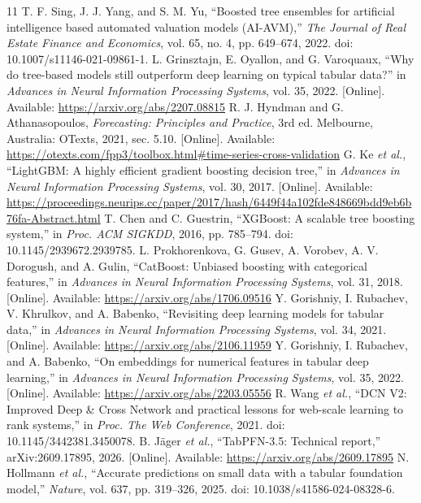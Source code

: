 \documentclass[conference]{IEEEtran}
\begin{document}
\clearpage
\nobalance
\begin{thebibliography}{11}
 T. F. Sing, J. J. Yang, and S. M. Yu, ``Boosted tree ensembles for artificial intelligence based automated valuation models (AI-AVM),'' \emph{The Journal of Real Estate Finance and Economics}, vol. 65, no. 4, pp. 649--674, 2022. doi: 10.1007/s11146-021-09861-1.
 L. Grinsztajn, E. Oyallon, and G. Varoquaux, ``Why do tree-based models still outperform deep learning on typical tabular data?'' in \emph{Advances in Neural Information Processing Systems}, vol. 35, 2022. [Online]. Available: \url{https://arxiv.org/abs/2207.08815}
 R. J. Hyndman and G. Athanasopoulos, \emph{Forecasting: Principles and Practice}, 3rd ed. Melbourne, Australia: OTexts, 2021, sec. 5.10. [Online]. Available: \url{https://otexts.com/fpp3/toolbox.html#time-series-cross-validation}
 G. Ke \emph{et al.}, ``LightGBM: A highly efficient gradient boosting decision tree,'' in \emph{Advances in Neural Information Processing Systems}, vol. 30, 2017. [Online]. Available: \url{https://proceedings.neurips.cc/paper/2017/hash/6449f44a102fde848669bdd9eb6b76fa-Abstract.html}
 T. Chen and C. Guestrin, ``XGBoost: A scalable tree boosting system,'' in \emph{Proc. ACM SIGKDD}, 2016, pp. 785--794. doi: 10.1145/2939672.2939785.
 L. Prokhorenkova, G. Gusev, A. Vorobev, A. V. Dorogush, and A. Gulin, ``CatBoost: Unbiased boosting with categorical features,'' in \emph{Advances in Neural Information Processing Systems}, vol. 31, 2018. [Online]. Available: \url{https://arxiv.org/abs/1706.09516}
 Y. Gorishniy, I. Rubachev, V. Khrulkov, and A. Babenko, ``Revisiting deep learning models for tabular data,'' in \emph{Advances in Neural Information Processing Systems}, vol. 34, 2021. [Online]. Available: \url{https://arxiv.org/abs/2106.11959}
 Y. Gorishniy, I. Rubachev, and A. Babenko, ``On embeddings for numerical features in tabular deep learning,'' in \emph{Advances in Neural Information Processing Systems}, vol. 35, 2022. [Online]. Available: \url{https://arxiv.org/abs/2203.05556}
 R. Wang \emph{et al.}, ``DCN V2: Improved Deep \& Cross Network and practical lessons for web-scale learning to rank systems,'' in \emph{Proc. The Web Conference}, 2021. doi: 10.1145/3442381.3450078.
 B. J\"ager \emph{et al.}, ``TabPFN-3.5: Technical report,'' arXiv:2609.17895, 2026. [Online]. Available: \url{https://arxiv.org/abs/2609.17895}
 N. Hollmann \emph{et al.}, ``Accurate predictions on small data with a tabular foundation model,'' \emph{Nature}, vol. 637, pp. 319--326, 2025. doi: 10.1038/s41586-024-08328-6.
\end{thebibliography}
\end{document}

